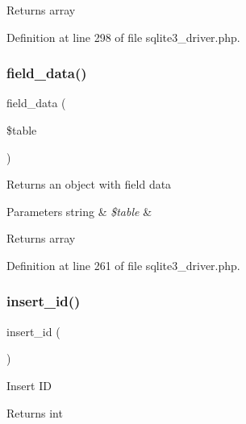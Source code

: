 \begin{DoxyReturn}{Returns}
array 
\end{DoxyReturn}


Definition at line 298 of file sqlite3\+\_\+driver.\+php.

\mbox{\label{class_c_i___d_b__sqlite3__driver_a90355121e1ed009e0efdbd544ab56efa}} 
\subsubsection{\texorpdfstring{field\_data()}{field\_data()}}
{\footnotesize\ttfamily field\+\_\+data (\begin{DoxyParamCaption}\item[{}]{\$table }\end{DoxyParamCaption})}

Returns an object with field data


\begin{DoxyParams}[1]{Parameters}
string & {\em \$table} & \\
\hline
\end{DoxyParams}
\begin{DoxyReturn}{Returns}
array 
\end{DoxyReturn}


Definition at line 261 of file sqlite3\+\_\+driver.\+php.

\mbox{\label{class_c_i___d_b__sqlite3__driver_a933f2cde8dc7f87875e257d0a4902e99}} 
\subsubsection{\texorpdfstring{insert\_id()}{insert\_id()}}
{\footnotesize\ttfamily insert\+\_\+id (\begin{DoxyParamCaption}{ }\end{DoxyParamCaption})}

Insert ID

\begin{DoxyReturn}{Returns}
int 
\end{DoxyReturn}


